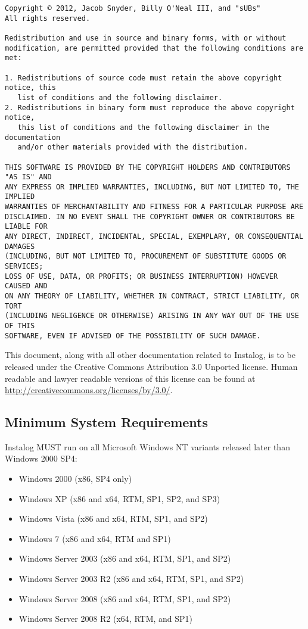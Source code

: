 \begin{verbatim}
Copyright © 2012, Jacob Snyder, Billy O'Neal III, and "sUBs"
All rights reserved.

Redistribution and use in source and binary forms, with or without
modification, are permitted provided that the following conditions are met: 

1. Redistributions of source code must retain the above copyright notice, this
   list of conditions and the following disclaimer. 
2. Redistributions in binary form must reproduce the above copyright notice,
   this list of conditions and the following disclaimer in the documentation
   and/or other materials provided with the distribution. 

THIS SOFTWARE IS PROVIDED BY THE COPYRIGHT HOLDERS AND CONTRIBUTORS "AS IS" AND
ANY EXPRESS OR IMPLIED WARRANTIES, INCLUDING, BUT NOT LIMITED TO, THE IMPLIED
WARRANTIES OF MERCHANTABILITY AND FITNESS FOR A PARTICULAR PURPOSE ARE
DISCLAIMED. IN NO EVENT SHALL THE COPYRIGHT OWNER OR CONTRIBUTORS BE LIABLE FOR
ANY DIRECT, INDIRECT, INCIDENTAL, SPECIAL, EXEMPLARY, OR CONSEQUENTIAL DAMAGES
(INCLUDING, BUT NOT LIMITED TO, PROCUREMENT OF SUBSTITUTE GOODS OR SERVICES;
LOSS OF USE, DATA, OR PROFITS; OR BUSINESS INTERRUPTION) HOWEVER CAUSED AND
ON ANY THEORY OF LIABILITY, WHETHER IN CONTRACT, STRICT LIABILITY, OR TORT
(INCLUDING NEGLIGENCE OR OTHERWISE) ARISING IN ANY WAY OUT OF THE USE OF THIS
SOFTWARE, EVEN IF ADVISED OF THE POSSIBILITY OF SUCH DAMAGE.
\end{verbatim}

This document, along with all other documentation related to Instalog,  is to be
released under the Creative Commons Attribution 3.0 Unported license. Human
readable and lawyer readable versions of this license can be found at
\url{http://creativecommons.org/licenses/by/3.0/}.

\subsection{Minimum System Requirements}
Instalog MUST run on all Microsoft Windows NT variants released later than
Windows 2000 SP4:
\begin{itemize}
  \item Windows 2000 (x86, SP4 only)
  \item Windows XP (x86 and x64, RTM, SP1, SP2, and SP3)
  \item Windows Vista (x86 and x64, RTM, SP1, and SP2)
  \item Windows 7 (x86 and x64, RTM and SP1)
  \item Windows Server 2003 (x86 and x64, RTM, SP1, and SP2)
  \item Windows Server 2003 R2 (x86 and x64, RTM, SP1, and SP2)
  \item Windows Server 2008 (x86 and x64, RTM, SP1, and SP2)
  \item Windows Server 2008 R2 (x64, RTM, and SP1)
\end{itemize}

